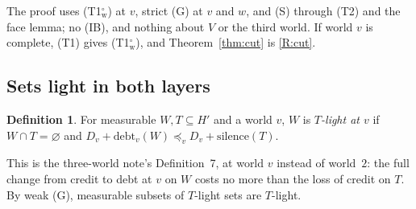 \documentclass[11pt]{article}
\theoremstyle{definition}\newtheorem{definition}[theorem]{Definition}
\theoremstyle{remark}\newtheorem{remark}[theorem]{Remark}
\newcommand{\debt}{\mathrm{debt}}
\newcommand{\sil}{\mathrm{silence}}
\newcommand{\Tw}{\textup{(T1$^\circ_{\mathrm w}$)}}
\begin{document}
The proof uses \Tw{} at $v$, strict (G) at $v$ and $w$, and (S) through
(T2) and the face lemma; no (IB), and nothing about $V$ or the third world.
If world $v$ is complete, (T1) gives \Tw{}, and Theorem~\ref{thm:cut} is
\ref{R:cut}.

\subsection{Sets light in both layers}\label{sec:light}

\begin{definition}\label{def:light}
For measurable $W,T\subseteq H'$ and a world $v$, $W$ is \emph{$T$-light at
$v$} if $W\cap T=\varnothing$ and $D_v+\debt_v(W)\preceq_vD_v+\sil(T)$.
\end{definition}

This is the three-world note's Definition~7, at world $v$ instead of
world~$2$: the full change from credit to debt at $v$ on $W$ costs no more
than the loss of credit on $T$. By weak (G), measurable subsets of
$T$-light sets are $T$-light.
\end{document}
